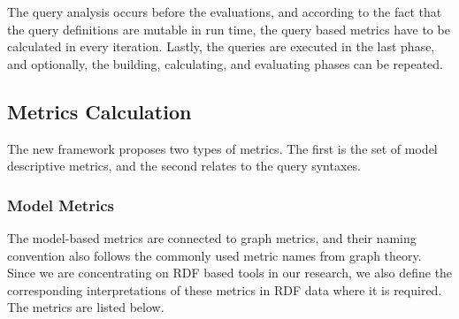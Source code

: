 The query analysis occurs before the evaluations, and according to the fact that the query definitions are mutable in run time, the query based metrics have to be calculated in every iteration. Lastly, the queries are executed in the last phase, and optionally, the building, calculating, and evaluating phases can be repeated.

\subsection{Metrics Calculation}
The new framework proposes two types of metrics. The first is the set of model descriptive metrics, and the second relates to the query syntaxes. 

\subsubsection{Model Metrics}
The model-based metrics are connected to graph metrics, and their naming convention also follows the commonly used metric names from graph theory. Since we are concentrating on RDF based tools in our research, we also define the corresponding interpretations of these metrics in RDF data where it is required. The metrics are listed below.
